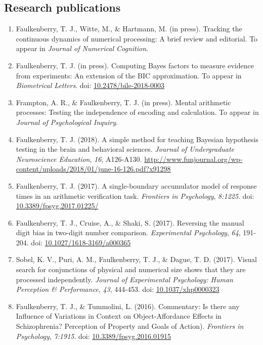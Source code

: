 \documentclass[article,10pt]{article}
\begin{document}
\subsection*{Research publications}
\label{sec:org8d31876}
\begin{enumerate}
\item Faulkenberry, T. J., Witte, M., \& Hartmann, M. (in press). Tracking the continuous dynamics of numerical processing: A brief review and editorial. To appear in \emph{Journal of Numerical Cognition}.
\item Faulkenberry, T. J. (in press). Computing Bayes factors to measure evidence from experiments: An extension of the BIC approximation. To appear in \emph{Biometrical Letters}. doi: \href{https://doi.org/10.2478/bile-2018-0003}{10.2478/bile-2018-0003}
\item Frampton, A. R., \& Faulkenberry, T. J. (in press). Mental arithmetic processes: Testing the independence of encoding and calculation. To appear in \emph{Journal of Psychological Inquiry}.
\item Faulkenberry, T. J. (2018). A simple method for teaching Bayesian hypothesis testing in the brain and behavioral sciences. \emph{Journal of Undergraduate Neuroscience Education}, \emph{16}, A126-A130. \url{http://www.funjournal.org/wp-content/uploads/2018/01/june-16-126.pdf?x91298}
\item Faulkenberry, T. J. (2017). A single-boundary accumulator model of response times in an arithmetic verification task. \emph{Frontiers in Psychology}, \emph{8:1225}. doi: \href{http://dx.doi.org/10.3389/fpsyg.2017.01225}{10.3389/fpsyg.2017.01225/}
\item Faulkenberry, T. J., Cruise, A., \& Shaki, S. (2017). Reversing the manual digit bias in two-digit number comparison. \emph{Experimental Psychology}, \emph{64}, 191-204.  doi: \href{http://dx.doi.org/10.1027/1618-3169/a000365}{10.1027/1618-3169/a000365}
\item Sobel, K. V., Puri, A. M., Faulkenberry, T. J., \& Dague, T. D. (2017). Visual search for conjunctions of physical and numerical size shows that they are processed independently. \emph{Journal of Experimental Psychology: Human Perception \& Performance}, \emph{43}, 444-453. doi: \href{http://dx.doi.org/10.1037/xhp0000323}{10.1037/xhp0000323}
\item Faulkenberry, T. J., \& Tummolini, L. (2016). Commentary: Is there any Influence of Variations in Context on Object-Affordance Effects in Schizophrenia? Perception of Property and Goals of Action). \emph{Frontiers in Psychology}, \emph{7:1915}. doi: \href{http://dx.doi.org/10.3389/fpsyg.2016.01915}{10.3389/fpsyg.2016.01915}

\end{enumerate}
\end{document}
